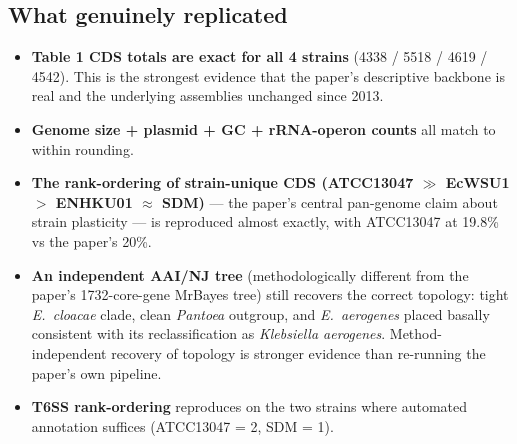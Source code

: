 \documentclass[11pt,letterpaper]{article}
\begin{document}
\subsection*{What genuinely replicated}
\begin{itemize}[leftmargin=*]
    \item \textbf{Table 1 CDS totals are exact for all 4 strains} (4338 / 5518 / 4619 / 4542). This is the strongest evidence that the paper's descriptive backbone is real and the underlying assemblies unchanged since 2013.
    \item \textbf{Genome size + plasmid + GC + rRNA-operon counts} all match to within rounding.
    \item \textbf{The rank-ordering of strain-unique CDS (ATCC13047 $\gg$ EcWSU1 $>$ ENHKU01 $\approx$ SDM)} --- the paper's central pan-genome claim about strain plasticity --- is reproduced almost exactly, with ATCC13047 at 19.8\% vs the paper's 20\%.
    \item \textbf{An independent AAI/NJ tree} (methodologically different from the paper's 1732-core-gene MrBayes tree) still recovers the correct topology: tight \textit{E.\ cloacae} clade, clean \textit{Pantoea} outgroup, and \textit{E.\ aerogenes} placed basally consistent with its reclassification as \textit{Klebsiella aerogenes}. Method-independent recovery of topology is stronger evidence than re-running the paper's own pipeline.
    \item \textbf{T6SS rank-ordering} reproduces on the two strains where automated annotation suffices (ATCC13047 = 2, SDM = 1).
\end{itemize}
\end{document}
